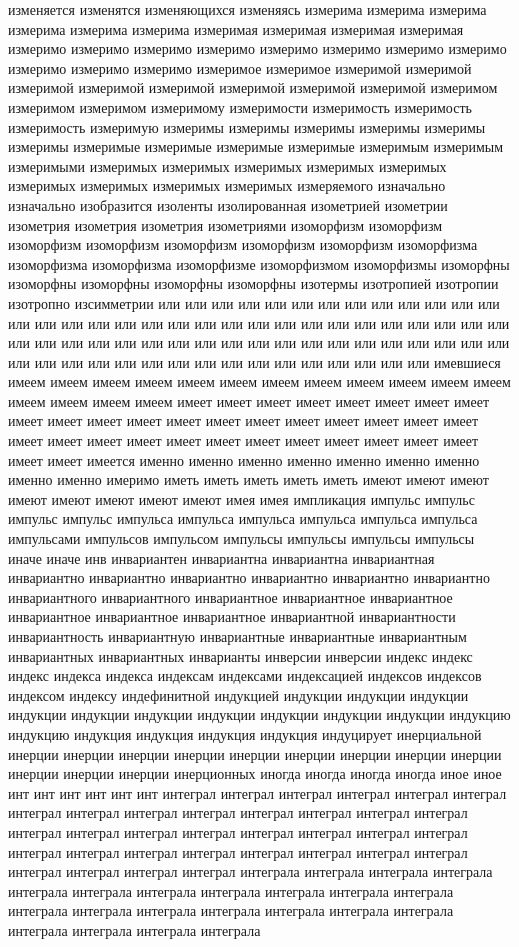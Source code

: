 изменяется изменятся изменяющихся изменяясь измерима измерима измерима измерима измерима измерима измеримая измеримая измеримая измеримая измеримо измеримо измеримо измеримо измеримо измеримо измеримо измеримо измеримо измеримо измеримо измеримое измеримое измеримой измеримой измеримой измеримой измеримой измеримой измеримой измеримой измеримом измеримом измеримом измеримому измеримости измеримость измеримость измеримость измеримую измеримы измеримы измеримы измеримы измеримы измеримы измеримые измеримые измеримые измеримые измеримым измеримым измеримыми измеримых измеримых измеримых измеримых измеримых измеримых измеримых измеримых измеримых измеряемого изначально изначально изобразится изоленты изолированная изометрией изометрии изометрия изометрия изометрия изометриями изоморфизм изоморфизм изоморфизм изоморфизм изоморфизм изоморфизм изоморфизм изоморфизма изоморфизма изоморфизма изоморфизме изоморфизмом изоморфизмы изоморфны изоморфны изоморфны изоморфны изоморфны изотермы изотропией изотропии изотропно изсимметрии или или или или или или или или или или или или или или или или или или или или или или или или или или или или или или или или или или или или или или или или или или или или или или или или или или или или или или или или или или или или или или или или или или или имевшиеся имеем имеем имеем имеем имеем имеем имеем имеем имеем имеем имеем имеем имеем имеем имеем имеем имеет имеет имеет имеет имеет имеет имеет имеет имеет имеет имеет имеет имеет имеет имеет имеет имеет имеет имеет имеет имеет имеет имеет имеет имеет имеет имеет имеет имеет имеет имеет имеет имеет имеет имеется именно именно именно именно именно именно именно именно именно имеримо иметь иметь иметь иметь иметь имеют имеют имеют имеют имеют имеют имеют имеют имея имея импликация импульс импульс импульс импульс импульса импульса импульса импульса импульса импульса импульсами импульсов импульсом импульсы импульсы импульсы импульсы иначе иначе инв инвариантен инвариантна инвариантна инвариантная инвариантно инвариантно инвариантно инвариантно инвариантно инвариантно инвариантного инвариантного инвариантное инвариантное инвариантное инвариантное инвариантное инвариантное инвариантной инвариантности инвариантность инвариантную инвариантные инвариантные инвариантным инвариантных инвариантных инварианты инверсии инверсии индекс индекс индекс индекса индекса индексам индексами индексацией индексов индексов индексом индексу индефинитной индукцией индукции индукции индукции индукции индукции индукции индукции индукции индукции индукции индукцию индукцию индукция индукция индукция индукция индуцирует инерциальной инерции инерции инерции инерции инерции инерции инерции инерции инерции инерции инерции инерции инерционных иногда иногда иногда иногда иное иное инт инт инт инт инт инт интеграл интеграл интеграл интеграл интеграл интеграл интеграл интеграл интеграл интеграл интеграл интеграл интеграл интеграл интеграл интеграл интеграл интеграл интеграл интеграл интеграл интеграл интеграл интеграл интеграл интеграл интеграл интеграл интеграл интеграл интеграл интеграл интеграл интеграл интеграла интеграла интеграла интеграла интеграла интеграла интеграла интеграла интеграла интеграла интеграла интеграла интеграла интеграла интеграла интеграла интеграла интеграла интеграла интеграла интеграла интеграла 